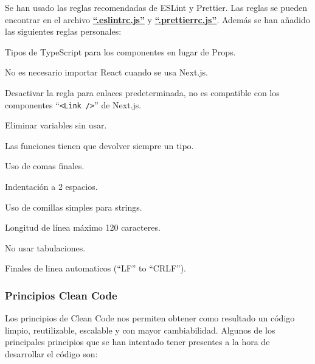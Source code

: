 \documentclass[12pt,twoside,titlepage]{report}
\begin{document}
Se han usado las reglas recomendadas de ESLint y Prettier. Las reglas se pueden encontrar en el archivo \href{https://github.com/alberttogoca/EarFit/blob/main/.eslintrc.js}{\textbf{``.eslintrc.js''}} y \href{https://github.com/alberttogoca/EarFit/blob/main/.prettierrc.js}{\textbf{``.prettierrc.js''}}. Además se han añadido las siguientes reglas personales:

\begin{compactitem}
    \item Tipos de TypeScript para los componentes en lugar de Props.
    \item No es necesario importar React cuando se usa Next.js.
    \item Desactivar la regla para enlaces predeterminada, no es compatible con los componentes ``\texttt{<Link />}'' de Next.js.
    \item Eliminar variables sin usar.
    \item Las funciones tienen que devolver siempre un tipo.
    \item Uso de comas finales.
    \item Indentación a 2 espacios.
    \item Uso de comillas simples para strings.
    \item Longitud de línea máximo 120 caracteres.
    \item No usar tabulaciones.
    \item Finales de linea automaticos (``LF'' to ``CRLF'').
\end{compactitem}

\subsubsection{Principios Clean Code}
\label{sec:cleancode}

Los principios de Clean Code \cite{cleancode} nos permiten obtener como resultado un código limpio, reutilizable, escalable y con mayor cambiabilidad. Algunos de los principales principios que se han intentado tener presentes a la hora de desarrollar el código son:
\end{document}
